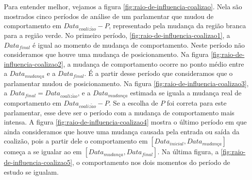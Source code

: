 \documentclass[a4paper,titlepage]{ppgi}\usepackage[]{graphicx}\usepackage[]{color}
\begin{document}
Para entender melhor, vejamos a figura \ref{fig:raio-de-influencia-coalizao}.
Nela são mostrados cinco períodos de análise de um parlamentar que mudou de
comportamento em $Data_{coaliz\tilde{a}o} - P$, representado pela mudança da
região branca para a região verde. No primeiro período,
\ref{fig:raio-de-influencia-coalizao1}, a $Data_{final}$ é igual ao momento de
mudança de comportamento. Neste período não consideramos que houve uma mudança
de posicionamento. Na figura \ref{fig:raio-de-influencia-coalizao2}, a mudança
de comportamento ocorre no ponto médio entre a $Data_{mudan\textit{\c{c}}a}$ e
a $Data_{final}$.  É a partir desse período que consideramos que o parlamentar
mudou de posicionamento. Na figura \ref{fig:raio-de-influencia-coalizao3}, a
$Data_{final} = Data_{coaliz\tilde{a}o}$, e a $Data_{mudan\textit{\c{c}}a}$
estimada se iguala a mudança real de comportamento em $Data_{coaliz\tilde{a}o}
- P$. Se a escolha de $P$ foi correta para este parlamentar, esse deve ser o
período com a mudança de comportamento mais intensa. A figura
\ref{fig:raio-de-influencia-coalizao4} mostra o último período em que ainda
consideramos que houve uma mudança causada pela entrada ou saída da coalizão,
pois a partir dele o comportamento em $\left[Data_{inicial},
Data_{mudan\textit{\c{c}}a}\right]$ começa a se igualar ao em
$\left[Data_{mudan\textit{\c{c}}a}, Data_{final}\right]$. Na última figura, a
\ref{fig:raio-de-influencia-coalizao5}, o comportamento nos dois momentos do
período de estudo se igualam.
\end{document}
